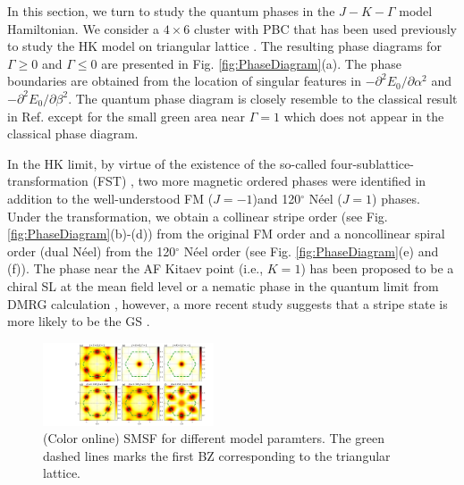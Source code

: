\documentclass[aps,prb,reprint,amsfonts,amsmath,amssymb,showpacs,groupedaddress,superscriptaddress]{revtex4-1}
\begin{document}
In this section, we turn to study the quantum phases in the $J-K-\Gamma$ model Hamiltonian. We consider a $4 \times 6$ cluster with PBC that has been used previously to study the HK model on triangular lattice \cite{KaiLi2015}. The resulting phase diagrams for $\Gamma \geq 0$ and $\Gamma \leq 0$ are presented in Fig. \ref{fig:PhaseDiagram}(a). The phase boundaries are obtained from the location of singular features in $-\partial^2E_0/\partial\alpha^2$ and $-\partial^2E_0/\partial\beta^2$. The quantum phase diagram is closely resemble to the classical result in Ref.  except for the small green area near $\Gamma=1$ which does not appear in the classical phase diagram.

In the HK limit, by virtue of the existence of the so-called four-sublattice-transformation (FST) \cite{PhysRevB.89.014414}, two more magnetic ordered phases were identified in addition to the well-understood FM ($J=-1$)and 120$^\circ$ N\'{e}el ($J=1$) phases. Under the transformation, we obtain a collinear stripe order (see Fig. \ref{fig:PhaseDiagram}(b)-(d)) from the original FM order and a noncollinear spiral order (dual N\'{e}el) from the 120$^\circ$ N\'{e}el order (see Fig. \ref{fig:PhaseDiagram}(e) and (f)). The phase near the AF Kitaev point (i.e., $K=1$) has been proposed to be a chiral SL at the mean field level \cite{KaiLi2015} or a nematic phase in the quantum limit from DMRG calculation \cite{PhysRevB.91.155135}, however, a more recent study suggests that a stripe state is more likely to be the GS \cite{PhysRevX.9.021017}.

\begin{figure}
    \includegraphics[width=0.45\textwidth]{Fig3.pdf}
    \caption{(Color online) SMSF for different model paramters. The green dashed lines marks the first BZ corresponding to the triangular lattice.}
     \label{fig:StructureFactors}
\end{figure}
\end{document}
